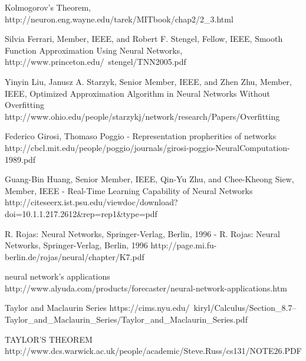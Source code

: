 \documentclass[times]{cpeauth}
\begin{document}
\begin{thebibliography}{9}

 Kolmogorov's Theorem,
http://neuron.eng.wayne.edu/tarek/MITbook/chap2/2\_3.html

 Silvia Ferrari, Member, IEEE, and Robert F. Stengel, Fellow, IEEE, Smooth Function Approximation Using
Neural Networks, http://www.princeton.edu/~stengel/TNN2005.pdf

 Yinyin Liu, Janusz A. Starzyk, Senior Member, IEEE, and Zhen Zhu, Member, IEEE,  Optimized Approximation Algorithm in Neural Networks Without Overfitting
http://www.ohio.edu/people/starzykj/network/research/Papers/Overfitting%

 Federico Girosi, Thomaso Poggio - Representation propherities of networks
http://cbcl.mit.edu/people/poggio/journals/girosi-poggio-NeuralComputation-1989.pdf

 Guang-Bin Huang, Senior Member, IEEE,  Qin-Yu Zhu, and  Chee-Kheong Siew, Member, IEEE -  Real-Time Learning Capability of Neural Networks
http://citeseerx.ist.psu.edu/viewdoc/download?doi=10.1.1.217.2612\&rep=rep1\&type=pdf

 R. Rojas: Neural Networks, Springer-Verlag, Berlin, 1996 - R. Rojas: Neural Networks, Springer-Verlag, Berlin, 1996
http://page.mi.fu-berlin.de/rojas/neural/chapter/K7.pdf

 neural network's applications
http://www.alyuda.com/products/forecaster/neural-network-applications.htm

 Taylor and Maclaurin Series
https://cims.nyu.edu/~kiryl/Calculus/Section\_8.7--Taylor\_and\_Maclaurin\_Series/Taylor\_and\_Maclaurin\_Series.pdf

 TAYLOR’S THEOREM
http://www.dcs.warwick.ac.uk/people/academic/Steve.Russ/cs131/NOTE26.PDF


\end{thebibliography}
\end{document}
